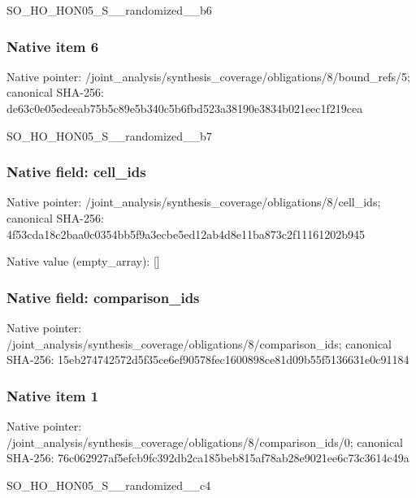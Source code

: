 \documentclass[10pt,a4paper]{article}
\begin{document}
\begingroup\raggedright\sloppy SO\_\allowbreak{}HO\_\allowbreak{}HON05\_\allowbreak{}S\_\allowbreak{}\_\allowbreak{}randomized\_\allowbreak{}\_\allowbreak{}b6\par\endgroup

\subsubsection{Native item 6}
Native pointer: /joint\_\allowbreak{}analysis/synthesis\_\allowbreak{}coverage/obligations/8/bound\_\allowbreak{}refs/5; canonical SHA-256: de63c0e05edeeab75b5c89e5b340c5b6fbd523a38190e3834b021eec1f219cea

\begingroup\raggedright\sloppy SO\_\allowbreak{}HO\_\allowbreak{}HON05\_\allowbreak{}S\_\allowbreak{}\_\allowbreak{}randomized\_\allowbreak{}\_\allowbreak{}b7\par\endgroup

\subsubsection{Native field: cell\_\allowbreak{}ids}
Native pointer: /joint\_\allowbreak{}analysis/synthesis\_\allowbreak{}coverage/obligations/8/cell\_\allowbreak{}ids; canonical SHA-256: 4f53cda18c2baa0c0354bb5f9a3ecbe5ed12ab4d8e11ba873c2f11161202b945

Native value (empty\_\allowbreak{}array): []

\subsubsection{Native field: comparison\_\allowbreak{}ids}
Native pointer: /joint\_\allowbreak{}analysis/synthesis\_\allowbreak{}coverage/obligations/8/comparison\_\allowbreak{}ids; canonical SHA-256: 15eb274742572d5f35ce6ef90578fec1600898ce81d09b55f5136631e0c91184

\subsubsection{Native item 1}
Native pointer: /joint\_\allowbreak{}analysis/synthesis\_\allowbreak{}coverage/obligations/8/comparison\_\allowbreak{}ids/0; canonical SHA-256: 76c062927af5efcb9fc392db2ca185beb815af78ab28e9021ee6c73c3614c49a

\begingroup\raggedright\sloppy SO\_\allowbreak{}HO\_\allowbreak{}HON05\_\allowbreak{}S\_\allowbreak{}\_\allowbreak{}randomized\_\allowbreak{}\_\allowbreak{}c4\par\endgroup
\end{document}
